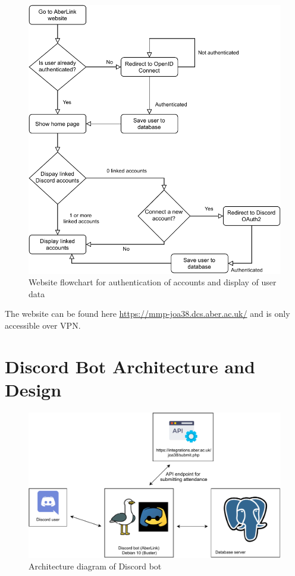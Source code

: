 \begin{figure}[H]
	\centering
	\includegraphics[width=0.8\linewidth]{Figures/website-flowchart}
	\caption{Website flowchart for authentication of accounts and display of user data}
	\label{fig:architecture-web-flow}
\end{figure}

The website can be found here \href{https://mmp-joa38.dcs.aber.ac.uk/}{https://mmp-joa38.dcs.aber.ac.uk/} and is only accessible over VPN.

\section{Discord Bot Architecture and Design}
\begin{figure}[H]
	\centering
	\includegraphics[width=0.9\linewidth]{Figures/Architecture-discord}
	\caption{Architecture diagram of Discord bot}
	\label{fig:architecture-dis}
\end{figure}

